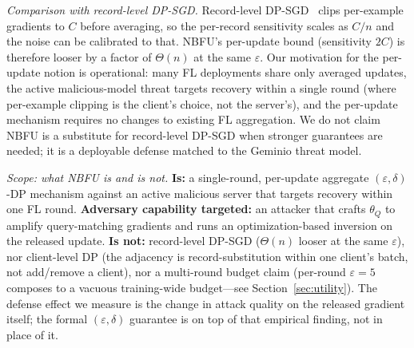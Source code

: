 \documentclass[11pt]{article}
\begin{document}
\emph{Comparison with record-level DP-SGD.} Record-level DP-SGD~\citep{dpsgd2016} clips per-example gradients to $C$ before averaging, so the per-record sensitivity scales as $C/n$ and the noise can be calibrated to that. NBFU's per-update bound (sensitivity $2C$) is therefore looser by a factor of $\Theta(n)$ at the same $\varepsilon$. Our motivation for the per-update notion is operational: many FL deployments share only averaged updates, the active malicious-model threat targets recovery within a single round (where per-example clipping is the client's choice, not the server's), and the per-update mechanism requires no changes to existing FL aggregation. We do not claim NBFU is a substitute for record-level DP-SGD when stronger guarantees are needed; it is a deployable defense matched to the Geminio threat model.

\emph{Scope: what NBFU is and is not.} \textbf{Is:} a single-round, per-update aggregate $(\varepsilon, \delta)$-DP mechanism against an active malicious server that targets recovery within one FL round. \textbf{Adversary capability targeted:} an attacker that crafts $\theta_Q$ to amplify query-matching gradients and runs an optimization-based inversion on the released update. \textbf{Is not:} record-level DP-SGD ($\Theta(n)$ looser at the same $\varepsilon$), nor client-level DP (the adjacency is record-substitution within one client's batch, not add/remove a client), nor a multi-round budget claim (per-round $\varepsilon{=}5$ composes to a vacuous training-wide budget---see Section~\ref{sec:utility}). The defense effect we measure is the change in attack quality on the released gradient itself; the formal $(\varepsilon, \delta)$ guarantee is on top of that empirical finding, not in place of it.
\end{document}
